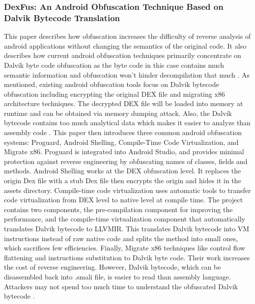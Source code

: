 \documentclass{article}
\begin{document}
\subsubsection{DexFus: An Android Obfuscation Technique Based on Dalvik Bytecode Translation}
This paper describes how obfuscation increases the difficulty of reverse analysis of android applications without changing the semantics of the original code. It also describes how current android obfuscation techniques primarily concentrate on Dalvik byte code obfuscation as the byte code in this case contains much semantic information and obfuscation won’t hinder decompilation that much \cite{naitian_dexfus_2020}.
As mentioned, existing android obfuscation tools focus on Dalvik bytecode obfuscation including encrypting the original DEX file and migrating x86 architecture techniques. The decrypted DEX file will be loaded into memory at runtime and can be obtained via memory dumping attack. Also, the Dalvik bytecode contains too much analytical data which makes it easier to analyze than assembly code \cite{naitian_dexfus_2020}.
This paper then introduces three common android obfuscation systems: Proguard, Android Shelling, Compile-Time Code Virtualization, and Migrate x86. Proguard is integrated into Android Studio, and provides minimal protection against reverse engineering by obfuscating names of classes, fields and methods. Android Shelling works at the DEX obfuscation level. It replaces the origin Dex file with a stub Dex file then encrypts the origin and hides it in the assets directory. Compile-time code virtualization uses automatic tools to transfer code virtualization from DEX level to native level at compile time. The project contains two components, the pre-compilation component for improving the performance, and the compile-time virtualization component that automatically translates Dalvik bytecode to LLVMIR. This translates Dalvik bytecode into VM instructions instead of raw native code and splits the method into small ones, which sacrifices few efficiencies. Finally, Migrate x86 techniques like control flow flattening and instructions substitution to Dalvik byte code. Their work increases the cost of reverse engineering. However, Dalvik bytecode, which can be disassembled back into .smali file, is easier to read than assembly language. Attackers may not spend too much time to understand the obfuscated Dalvik bytecode \cite{naitian_dexfus_2020}.
\end{document}
